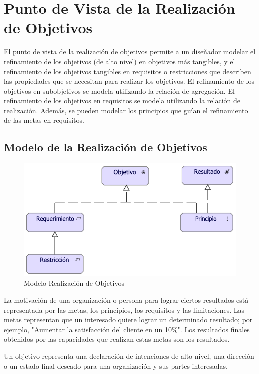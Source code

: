\section{Punto de Vista de la Realización de Objetivos}

El punto de vista de la realización de objetivos permite a un diseñador modelar el refinamiento de los objetivos (de alto nivel) en objetivos más tangibles, y el refinamiento de los objetivos tangibles en requisitos o restricciones que describen las propiedades que se necesitan para realizar los objetivos. El refinamiento de los objetivos en subobjetivos se modela utilizando la relación de agregación. El refinamiento de los objetivos en requisitos se modela utilizando la relación de realización.
Además, se pueden modelar los principios que guían el refinamiento de las metas en requisitos.

\subsection{Modelo de la Realización de Objetivos}
\begin{figure}[h!]
	\centering
	\includegraphics[width=1.0\linewidth]{imgs/modelo/realObjetivos.pdf}
	\caption{Modelo Realización de Objetivos}
\end{figure}

La motivación de una organización o persona para lograr ciertos resultados está representada por las metas, los principios, los requisitos y las limitaciones. Las metas representan que un interesado quiere lograr un determinado resultado; por ejemplo, "Aumentar la satisfacción del cliente en un 10\%". Los resultados finales obtenidos por las capacidades que realizan estas metas son los resultados.

Un objetivo representa una declaración de intenciones de alto nivel, una dirección o un estado final deseado para una organización y sus partes interesadas.

